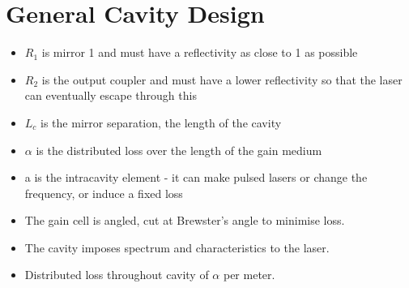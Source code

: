 \documentclass[a4paper, 11pt, normalem]{report}
\begin{document}
\section{General Cavity Design}
\begin{figure}[H]
    \centering
\end{figure}
\begin{itemize}
    \item $R_1$ is mirror 1 and must have a reflectivity as close to 1 as possible
    \item $R_2$ is the output coupler and must have a lower reflectivity so that the laser can eventually escape through this
    \item $L_c$ is the mirror separation, the length of the cavity
    \item $\alpha$ is the distributed loss over the length of the gain medium
    \item a is the intracavity element - it can make pulsed lasers or change the frequency, or induce a fixed loss
    \item The gain cell is angled, cut at Brewster's angle to minimise loss.
    \item The cavity imposes spectrum and characteristics to the laser.
    \item Distributed loss throughout cavity of $\alpha$ per meter.
\end{itemize}
\end{document}
